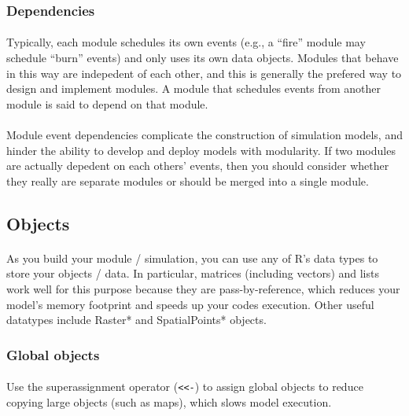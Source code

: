 \documentclass{article}
\begin{document}
\subsubsection{Dependencies}

\paragraph{} %
Typically, each module schedules its own events (e.g., a ``fire'' module may schedule ``burn'' events) and only uses its own data objects. Modules that behave in this way are indepedent of each other, and this is generally the prefered way to design and implement modules. A module that schedules events from another module is said to depend on that module.

\paragraph{}
Module event dependencies complicate the construction of simulation models, and hinder the ability to develop and deploy models with modularity. If two modules are actually depedent on each others' events, then you should consider whether they really are separate modules or should be merged into a single module.

\subsection{Objects}

\paragraph{} %
As you build your module / simulation, you can use any of \textsf{R}'s data types to store your objects / data. In particular, matrices (including vectors) and lists work well for this purpose because they are pass-by-reference, which reduces your model's memory footprint and speeds up your codes execution. Other useful datatypes include Raster* and SpatialPoints* objects.

\subsubsection{Global objects}

\paragraph{} %
Use the superassignment operator (\texttt{<}\texttt{<-}) to assign global objects to reduce copying large objects (such as maps), which slows model execution.
\end{document}
